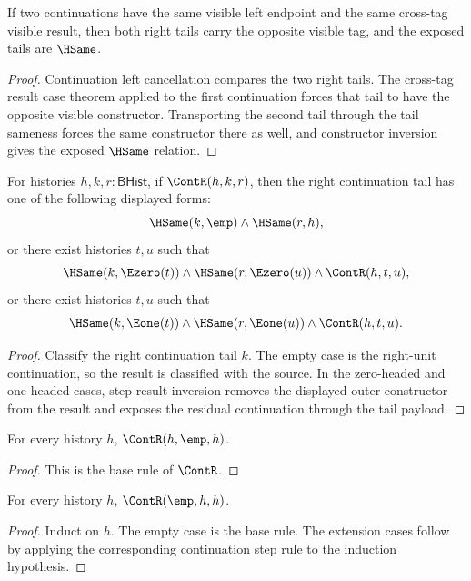 \begin{theorem}
\label{thm:cont-left-tag-cross-tail-alignment}
If two continuations have the same visible left endpoint and the same
cross-tag visible result, then both right tails carry the opposite visible tag,
and the exposed tails are $\HSame$.
\end{theorem}
\begin{proof}
Continuation left cancellation compares the two right tails. The cross-tag
result case theorem applied to the first continuation forces that tail to have
the opposite visible constructor. Transporting the second tail through the
tail sameness forces the same constructor there as well, and constructor
inversion gives the exposed $\HSame$ relation.
\end{proof}

\begin{theorem}
\label{thm:cont-right-tail-result-cases}
For histories $h,k,r:\mathsf{BHist}$, if $\ContR(h,k,r)$, then the right
continuation tail has one of the following displayed forms:
$$
\HSame(k,\emp)\land\HSame(r,h),
$$
or there exist histories $t,u$ such that
$$
\HSame(k,\Ezero(t))\land\HSame(r,\Ezero(u))\land\ContR(h,t,u),
$$
or there exist histories $t,u$ such that
$$
\HSame(k,\Eone(t))\land\HSame(r,\Eone(u))\land\ContR(h,t,u).
$$
\end{theorem}
\begin{proof}
Classify the right continuation tail $k$. The empty case is the right-unit
continuation, so the result is classified with the source. In the zero-headed
and one-headed cases, step-result inversion removes the displayed outer
constructor from the result and exposes the residual continuation through the
tail payload.
\end{proof}

\begin{lemma}
For every history \(h\), \(\ContR(h,\emp,h)\).
\end{lemma}
\begin{proof}
This is the base rule of \(\ContR\).
\end{proof}

\begin{lemma}
For every history \(h\), \(\ContR(\emp,h,h)\).
\end{lemma}
\begin{proof}
Induct on \(h\). The empty case is the base rule. The extension cases follow by applying the corresponding continuation step rule to the induction hypothesis.
\end{proof}

